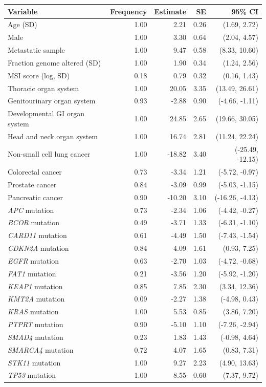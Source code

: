 \begin{tabular}{lrrrr}
\toprule
Variable & Frequency & Estimate & SE & 95\% CI\\
\midrule
Age (SD) & 1.00 & 2.21 & 0.26 & (1.69, 2.72)\\
Male & 1.00 & 3.30 & 0.64 & (2.04, 4.57)\\
Metastatic sample & 1.00 & 9.47 & 0.58 & (8.33, 10.60)\\
Fraction genome altered (SD) & 1.00 & 1.90 & 0.34 & (1.24, 2.56)\\
MSI score (log, SD) & 0.18 & 0.79 & 0.32 & (0.16, 1.43)\\
Thoracic organ system & 1.00 & 20.05 & 3.35 & (13.49, 26.61)\\
Genitourinary organ system & 0.93 & -2.88 & 0.90 & (-4.66, -1.11)\\
Developmental GI organ system & 1.00 & 24.85 & 2.65 & (19.66, 30.05)\\
Head and neck organ system & 1.00 & 16.74 & 2.81 & (11.24, 22.24)\\
Non-small cell lung cancer & 1.00 & -18.82 & 3.40 & (-25.49, -12.15)\\
Colorectal cancer & 0.73 & -3.34 & 1.21 & (-5.72, -0.97)\\
Prostate cancer & 0.84 & -3.09 & 0.99 & (-5.03, -1.15)\\
Pancreatic cancer & 0.90 & -10.20 & 3.10 & (-16.26, -4.13)\\
\textit{APC} mutation & 0.73 & -2.34 & 1.06 & (-4.42, -0.27)\\
\textit{BCOR} mutation & 0.49 & -3.71 & 1.33 & (-6.31, -1.10)\\
\textit{CARD11} mutation & 0.61 & -4.49 & 1.50 & (-7.43, -1.54)\\
\textit{CDKN2A} mutation & 0.84 & 4.09 & 1.61 & (0.93, 7.25)\\
\textit{EGFR} mutation & 0.63 & -2.70 & 1.03 & (-4.72, -0.68)\\
\textit{FAT1} mutation & 0.21 & -3.56 & 1.20 & (-5.92, -1.20)\\
\textit{KEAP1} mutation & 0.85 & 7.85 & 2.30 & (3.34, 12.36)\\
\textit{KMT2A} mutation & 0.09 & -2.27 & 1.38 & (-4.98, 0.43)\\
\textit{KRAS} mutation & 1.00 & 5.53 & 0.85 & (3.86, 7.20)\\
\textit{PTPRT} mutation & 0.90 & -5.10 & 1.10 & (-7.26, -2.94)\\
\textit{SMAD4} mutation & 0.23 & 1.83 & 1.43 & (-0.98, 4.64)\\
\textit{SMARCA4} mutation & 0.72 & 4.07 & 1.65 & (0.83, 7.31)\\
\textit{STK11} mutation & 1.00 & 9.27 & 2.23 & (4.90, 13.63)\\
\textit{TP53} mutation & 1.00 & 8.55 & 0.60 & (7.37, 9.72)\\
\bottomrule
\end{tabular}
